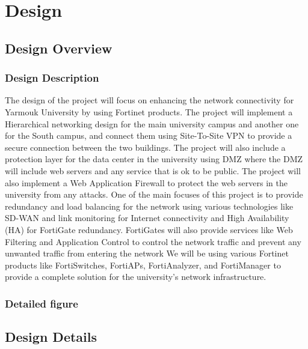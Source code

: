 \documentclass[12pt]{report}
\begin{document}
\chapter{Design}

\section{Design Overview}
\subsection{Design Description}
The design of the project will focus on enhancing the network connectivity for Yarmouk University by using Fortinet products. The project will implement a Hierarchical networking design for the main university campus and another one for the South campus, and connect them using Site-To-Site VPN to provide a secure connection between the two buildings. The project will also include a protection layer for the data center in the university using DMZ where the DMZ will include web servers and any service that is ok to be public. The project will also implement a Web Application Firewall to protect the web servers in the university from any attacks. One of the main focuses of this project is to provide redundancy and load balancing for the network using various technologies like SD-WAN and link monitoring for Internet connectivity and High Availability (HA) for FortiGate redundancy. FortiGates will also provide services like Web Filtering and Application Control to control the network traffic and prevent any unwanted traffic from entering the network We will be using various Fortinet products like FortiSwitches, FortiAPs, FortiAnalyzer, and FortiManager to provide a complete solution for the university's network infrastructure.

\subsection{Detailed figure}

\section{Design Details}
\end{document}
